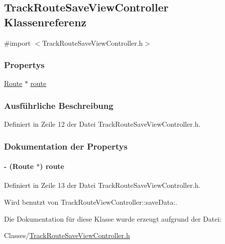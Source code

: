 \hypertarget{interface_track_route_save_view_controller}{
\subsection{TrackRouteSaveViewController Klassenreferenz}
\label{interface_track_route_save_view_controller}
}


{\ttfamily \#import $<$TrackRouteSaveViewController.h$>$}\subsubsection*{Propertys}
\begin{DoxyCompactItemize}
\item 
\hyperlink{interface_route}{Route} $\ast$ \hyperlink{interface_track_route_save_view_controller_a209efe5036587664f450a55bb4b5afe0}{route}
\end{DoxyCompactItemize}


\subsubsection{Ausführliche Beschreibung}


Definiert in Zeile 12 der Datei TrackRouteSaveViewController.h.

\subsubsection{Dokumentation der Propertys}
\hypertarget{interface_track_route_save_view_controller_a209efe5036587664f450a55bb4b5afe0}{
\paragraph[{route}]{\setlength{\rightskip}{0pt plus 5cm}-\/ ({\bf Route} $\ast$) route}\hfill}
\label{interface_track_route_save_view_controller_a209efe5036587664f450a55bb4b5afe0}


Definiert in Zeile 13 der Datei TrackRouteSaveViewController.h.

Wird benutzt von TrackRouteViewController::saveData:.

Die Dokumentation für diese Klasse wurde erzeugt aufgrund der Datei:\begin{DoxyCompactItemize}
\item 
Classes/\hyperlink{_track_route_save_view_controller_8h}{TrackRouteSaveViewController.h}\end{DoxyCompactItemize}
